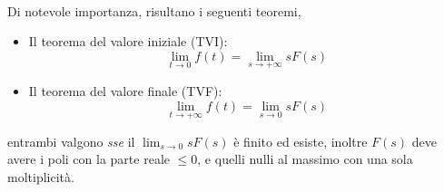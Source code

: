 \paragraph{}
Di notevole importanza, risultano i seguenti teoremi,
\begin{itemize}
	\item Il teorema del valore iniziale (TVI):
	\begin{equation}
		\lim_{t \to 0} f(t) = \lim_{s \to +\infty} sF(s)
	\end{equation}
	\item Il teorema del valore finale (TVF):
	\begin{equation}
		\lim_{t \to +\infty} f(t) = \lim_{s \to 0} sF(s)
	\end{equation}
\end{itemize}
entrambi valgono \emph{sse} il $\lim_{s \to 0}sF(s)$ è finito ed esiste, inoltre $F(s)$ deve avere i poli con la parte reale $\leqslant 0$, e quelli nulli al massimo con una sola moltiplicità.
